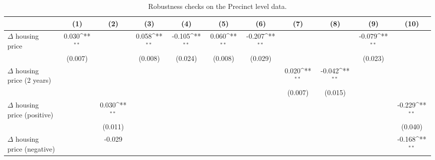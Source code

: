 \documentclass[preview,12pt,varwidth]{standalone}
\begin{document}
	
\begin{sidewaystable}[htbp]\centering
\def\sym#1{\ifmmode^{#1}\else\(^{#1}\)\fi}
\caption{Robustness checks on the Precinct level data.} \label{apdxprerobust}
\begin{tabular}{l*{10}{c}}
\hline\hline
                    &\multicolumn{1}{c}{(1)}        &\multicolumn{1}{c}{(2)}        &\multicolumn{1}{c}{(3)}        &\multicolumn{1}{c}{(4)}        &\multicolumn{1}{c}{(5)}        &\multicolumn{1}{c}{(6)}        &\multicolumn{1}{c}{(7)}        &\multicolumn{1}{c}{(8)}        &\multicolumn{1}{c}{(9)}        &\multicolumn{1}{c}{(10)}        \\
\hline
$\Delta$ housing price&       0.030\sym{**}&                    &       0.058\sym{**}&      -0.105\sym{**}&       0.060\sym{**}&      -0.207\sym{**}&                    &                    &      -0.079\sym{**}&                    \\
                    &     (0.007)        &                    &     (0.008)        &     (0.024)        &     (0.008)        &     (0.029)        &                    &                    &     (0.023)        &                    \\
[1em]
$\Delta$ housing price (2 years)&                    &                    &                    &                    &                    &                    &       0.020\sym{**}&      -0.042\sym{**}&                    &                    \\
                    &                    &                    &                    &                    &                    &                    &     (0.007)        &     (0.015)        &                    &                    \\
[1em]
$\Delta$ housing price (positive)&                    &       0.030\sym{**}&                    &                    &                    &                    &                    &                    &                    &      -0.229\sym{**}\\
                    &                    &     (0.011)        &                    &                    &                    &                    &                    &                    &                    &     (0.040)        \\
[1em]
$\Delta$ housing price (negative)&                    &      -0.029        &                    &                    &                    &                    &                    &                    &                    &      -0.168\sym{**}\\

\end{tabular}
\end{sidewaystable}
\end{document}
